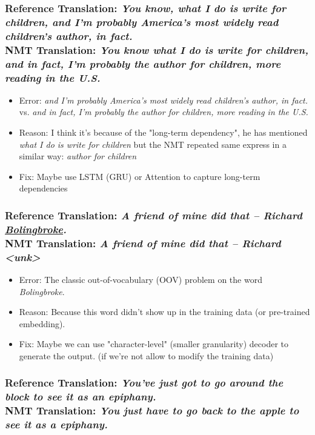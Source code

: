 \documentclass[12pt, letterpaper]{article}
\begin{document}
\subsubsection{\textbf{Reference Translation}: \textit{You know, what I do is write for children, and I’m probably America’s most widely read children’s author, in fact.} \\ \textbf{NMT Translation}: \textit{You know what I do is write for children, and in fact, I’m probably the author for children, more reading in the U.S.}}

\begin{itemize}
  \item Error: \textit{and I’m probably America’s most widely read children’s author, in fact.} vs. \textit{and in fact, I’m probably the author for children, more reading in the U.S.}
  \item Reason: I think it's because of the "long-term dependency", he has mentioned \textit{what I do is write for children} but the NMT repeated same express in a similar way: \textit{author for children}
  \item Fix: Maybe use LSTM (GRU) or Attention to capture long-term dependencies
\end{itemize}

\subsubsection{\textbf{Reference Translation}: \textit{A friend of mine did that – Richard \underline{Bolingbroke}.} \\ \textbf{NMT Translation}: \textit{A friend of mine did that – Richard <unk>}}

\begin{itemize}
  \item Error: The classic out-of-vocabulary (OOV) problem on the word \textit{Bolingbroke}.
  \item Reason: Because this word didn't show up in the training data (or pre-trained embedding).
  \item Fix: Maybe we can use "character-level" (smaller granularity) decoder to generate the output. (if we're not allow to modify the training data)
\end{itemize}

\subsubsection{\textbf{Reference Translation}: \textit{You’ve just got to go around the block to see it as an epiphany.} \\ \textbf{NMT Translation}: \textit{You just have to go back to the apple to see it as a epiphany.}}
\end{document}
